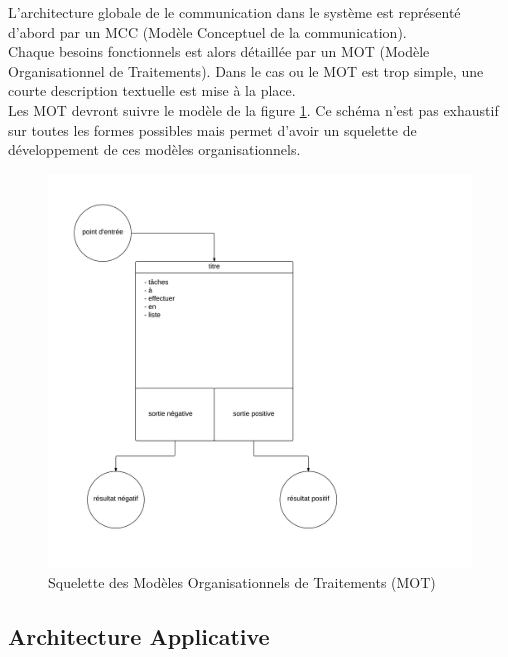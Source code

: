 L'architecture globale de le communication dans le système est représenté
d'abord par un MCC (Modèle Conceptuel de la communication). \\

Chaque besoins fonctionnels est alors détaillée par un MOT (Modèle
Organisationnel de Traitements). Dans le cas ou le MOT est trop simple, une
courte description textuelle est mise à la place. \\

Les MOT devront suivre le modèle de la figure \ref{fig:mot-skeleton}. Ce schéma
n'est pas exhaustif sur toutes les formes possibles mais permet d'avoir un
squelette de développement de ces modèles organisationnels. \\

\begin{figure}[ht]
    \centering
    \includegraphics[width=\textwidth]{mot-skeleton}
    \caption{Squelette des Modèles Organisationnels de Traitements (MOT)}
    \label{fig:mot-skeleton}
\end{figure}

\subsection{Architecture Applicative}



